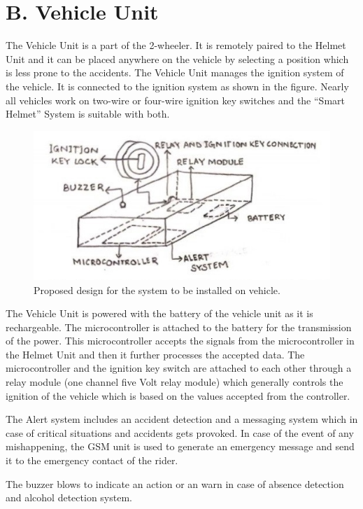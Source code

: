 \section*{B. Vehicle Unit}
The Vehicle Unit is a part of the 2-wheeler. It is remotely paired to the Helmet Unit and it can be placed anywhere on the vehicle by selecting a position which is less prone to the accidents. The Vehicle Unit manages the ignition system of the vehicle. It is connected to the ignition system as shown in the figure. Nearly all vehicles work on two-wire or four-wire ignition key switches and the “Smart Helmet” System is suitable with both. 

\begin{figure}
	\centering
	\includegraphics[width=0.7\linewidth]{"images/Vehicle unit"}
	\captionsetup{labelformat=empty}
	\caption[]{Proposed design for the system to be installed on vehicle.}
\end{figure}

The Vehicle Unit is powered with the battery of the vehicle unit as it is rechargeable. The microcontroller is attached to the battery for the transmission of the power. This microcontroller accepts the signals from the microcontroller in the Helmet Unit and then it further processes the accepted data. The microcontroller and the ignition key switch are attached to each other through a relay module (one channel five Volt relay module) which generally controls the ignition of the vehicle which is based on the values accepted from the controller.\vspace{.3cm}

The Alert system includes an accident detection and a messaging system which in case of critical situations and accidents gets provoked. In case of the event of any mishappening, the GSM unit is used to generate an emergency message and send it to the emergency contact of the rider.\vspace{.3cm}

The buzzer blows to indicate an action or an warn in case of absence detection and alcohol detection system.

